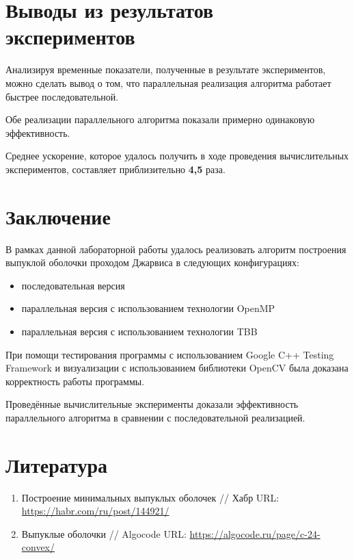 \documentclass{report}
\begin{document}
\newpage

\section*{Выводы из результатов экспериментов}
\par Анализируя временные показатели, полученные в результате экспериментов, можно сделать вывод о том, что параллельная реализация алгоритма работает быстрее последовательной.
\par Обе реализации параллельного алгоритма показали примерно одинаковую эффективность.
\par Среднее ускорение, которое удалось получить в ходе проведения вычислительных экспериментов, составляет приблизительно \textbf{4,5} раза.
\newpage

\section*{Заключение}
\par В рамках данной лабораторной работы удалось реализовать алгоритм построения выпуклой оболочки проходом Джарвиса в следующих конфигурациях:
\begin{itemize}
\item последовательная версия
\item параллельная версия с использованием технологии OpenMP
\item параллельная версия с использованием технологии TBB
\end{itemize}
\par При помощи тестирования программы с использованием Google C++ Testing Framework и визуализации с использованием библиотеки OpenCV была доказана корректность работы программы. 
\par Проведённые вычислительные эксперименты доказали эффективность параллельного алгоритма в сравнении с последовательной реализацией.
\newpage

\section*{Литература}
\begin{enumerate}
\item Построение минимальных выпуклых оболочек // Хабр URL: \url{https://habr.com/ru/post/144921/} 
\item Выпуклые оболочки // Algocode URL: \url{https://algocode.ru/page/c-24-convex/}
\end{enumerate} 
\newpage
\end{document}
